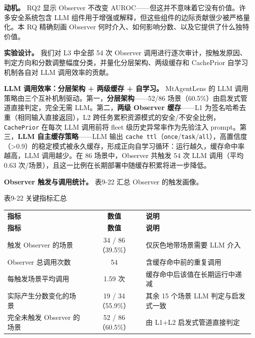 \documentclass[a4paper]{ctexart}
\makeatletter
\renewcommand{\_}{%
  \ifmmode
    \nfss@text{\textunderscore}%
  \else
    \textunderscore\discretionary{}{}{}%
  \fi}
\makeatother
\begin{document}
\textbf{动机。} RQ2 显示 Observer 不改变 AUROC——但这并不意味着它没有价值。许多安全系统包含 LLM 组件用于增强或解释，但这些组件的边际贡献很少被严格量化。本 RQ 精确刻画 Observer 何时介入、如何影响分数、以及它提供了什么独特价值。


\textbf{实验设计。} 我们对 L3 中全部 54 次 Observer 调用进行逐次审计，按触发原因、判定方向和分数调整幅度分类，并量化分层架构、两级缓存和 CachePrior 自学习机制各自对 LLM 调用效率的贡献。


\textbf{LLM 调用效率：分层架构 + 两级缓存 + 自学习。} MtAgentLens 的 LLM 调用策略由三个互补机制驱动。第一，\textbf{分层架构}——52/86 场景（60.5\%）由启发式管道直接判定，完全无需 LLM。第二，\textbf{两级 Observer 缓存}——L1 为签名哈希去重（相同输入直接返回），L2 跨任务累积资源模式的安全/不安全比例，\texttt{CachePrior} 在每次 LLM 调用前将 fleet 级历史异常率作为先验注入 prompt。第三，\textbf{LLM 自主缓存策略}——LLM 输出 \texttt{cache\_ttl}（\texttt{once}/\texttt{task}/\texttt{all}），高置信度（>0.9）的稳定模式被永久缓存，形成正向自学习循环：运行越久，缓存命中率越高，LLM 调用越少。在 86 场景中，Observer 共触发 54 次 LLM 调用（平均 0.63 次/场景），且这一比例在长期部署中随缓存积累将进一步降低。


\textbf{Observer 触发与调用统计。} 表9-22 汇总 Observer 的触发画像。




\medskip
{\centering\small
表9-22 关键指标汇总\par
\vspace{3pt}
\setlength{\tabcolsep}{6pt}
\renewcommand{\arraystretch}{1.1}
\begin{longtable}{>{\raggedright\arraybackslash}p{6.0cm} c >{\raggedright\arraybackslash}p{6.0cm}}
\hline
\textbf{指标} & \textbf{数值} & \textbf{说明} \\*
\hline
\endfirsthead
\hline
\textbf{指标} & \textbf{数值} & \textbf{说明} \\
\hline
\endhead
\hline
\endfoot
\hline
\endlastfoot
触发 Observer 的场景 & 34 / 86（39.5\%） & 仅灰色地带场景需要 LLM 介入 \\*
\hline
Observer 总调用次数 & 54 & 含缓存命中前的重复调用 \\
\hline
每触发场景平均调用 & 1.59 次 & 缓存命中后该值在长期运行中递减 \\
\hline
实际产生分数变化的场景 & 19 / 34（55.9\%） & 其余 15 个场景 LLM 判定与启发式一致 \\
\hline
完全未触发 Observer 的场景 & 52 / 86（60.5\%） & 由 L1+L2 启发式管道直接判定 \\
\hline
\end{longtable}
\par}
\end{document}
